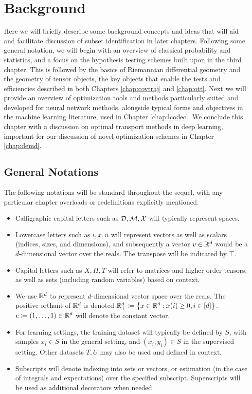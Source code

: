 \chapter{Background}\label{chap:bknd}
Here we will briefly describe some background concepts and ideas that will aid and facilitate discussion of subset identification in later chapters. 
Following some general notation,
we will begin with an overview
of classical probability and statistics,
and a focus on the hypothesis testing
schemes built upon in the third chapter.
This is followed by the basics of Riemannian differential geometry
and the geometry of tensor objects,
the key objects that enable the 
tests and efficiencies described in both 
Chapters \ref{chap:covtraj} and \ref{chap:ott}.
Next we will provide
an overview of optimization tools
and methods particularly suited
and developed for neural network methods,
alongside typical forms and objectives 
in the machine learning literature,
used in Chapter \ref{chap:lcodec}.
We conclude this chapter
with a discussion on optimal transport
methods in deep learning, important
for our discussion of novel optimization schemes
in Chapter \ref{chap:demd}.

\section{General Notations}
The following notations will be standard throughout the sequel, with any particular chapter overloads or redefinitions explicitly mentioned.
\begin{itemize}
\item Calligraphic capital letters such as $\mathcal{D}, \mathcal{M}, \mathcal{X}$ will typically represent spaces.

\item Lowercase letters such as $i,x,n$ will represent vectors as well as scalars (indices, sizes, and dimensions), and subsequently a vector $v \in \mathbb{R}^d$ would be a $d$-dimensional vector over the reals. The transpose will be indicated by $\top$.

\item Capital letters such as $X,H,T$ will refer to matrices and higher order tensors, as well as sets (including random variables) based on context.

\item We use $\mathbb{R}^d$ to represent $d$-dimensional vector space over the reals. The positive orthant of $\mathbb{R}^d$ is denoted $\mathbb{R}_{+}^{d} \coloneqq \left\{x\in\mathbb{R}^{d}:x(i)\geq 0, i\in [d]\right\}$. $e\coloneqq (1,\ldots,1)\in\mathbb{R}^{d}$ will denote the constant vector. 

\item For learning settings, the training dataset will typically be defined by $S$, with samples $x_i \in S$ in the general setting, and $(x_i,y_i)\in S$ in the supervised setting. Other datasets $T,U$ may also be used and defined in context.

\item Subscripts will denote indexing into sets or vectors, or estimation (in the case of integrals and expectations) over the specified subscript. Superscripts will be used as additional decorators when needed.

\end{itemize}

